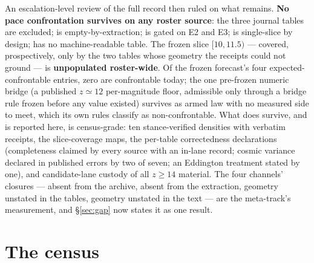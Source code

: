 \documentclass[twocolumn]{aastex702}
\begin{document}
An escalation-level review of the full record then ruled on what remains. \textbf{No
pace confrontation survives on any roster source}: the three journal tables are
excluded; \citet{whitler25} is empty-by-extraction; \citet{weibel26} is gated on E2 and
E3; \citet{rojasruiz25} is single-slice by design; \citet{donnan23} has no
machine-readable table. The frozen slice $[10,11.5)$ --- covered, prospectively, only by
the two tables whose geometry the receipts could not ground --- is \textbf{unpopulated
roster-wide}. Of the frozen forecast's four expected-confrontable entries, zero are
confrontable today; the one pre-frozen numeric bridge (a published $z\simeq12$
per-magnitude floor, admissible only through a bridge rule frozen before any value
existed) survives as armed law with no measured side to meet, which its own rules
classify as non-confrontable. What does survive, and is reported here, is census-grade:
ten stance-verified densities with verbatim receipts, the slice-coverage maps, the
per-table correctedness declarations (completeness claimed by every source with an
in-lane record; cosmic variance declared in published errors by two of seven; an
Eddington treatment stated by one), and
candidate-lane custody of all $z\ge14$ material. The four channels' closures ---
absent from the archive, absent from the extraction, geometry unstated in the tables,
geometry unstated in the text --- are the meta-track's measurement, and
\S\ref{sec:gap} now states it as one result.

\section{The census} \label{sec:census}
\end{document}
